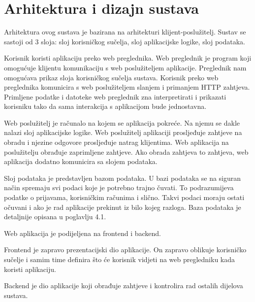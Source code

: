 \chapter{Arhitektura i dizajn sustava}
		
		Arhitektura ovog sustava je bazirana na arhitekturi klijent-poslužitelj. Sustav se sastoji od 3 sloja: sloj korisničkog sučelja, sloj aplikacijske logike, sloj podataka.
		
		Korisnik koristi aplikaciju preko web preglednika. Web preglednik je program koji omogućuje klijentu komunikaciju s web poslužiteljem aplikacije. Preglednik nam omogućava prikaz sloja korisničkog sučelja sustava. Korisnik preko web preglednika komunicira s web poslužiteljem slanjem i primanjem HTTP zahtjeva. Primljene podatke i datoteke web preglednik zna interpretirati i prikazati korisniku tako da sama interakcija s aplikacijom bude jednostavna.
		
		Web poslužitelj je računalo na kojem se aplikacija pokreće. Na njemu se dakle nalazi sloj aplikacijske logike. Web poslužitelj aplikaciji prosljeđuje zahtjeve na obradu i njezine odgovore prosljeđuje natrag klijentima. Web aplikacija na poslužitelju obrađuje zaprimljene zahtjeve. Ako obrada zahtjeva to zahtjeva, web aplikacija dodatno komunicira sa slojem podataka.
		
		Sloj podataka je predstavljen bazom podataka. U bazi podataka se na siguran način spremaju svi podaci koje je potrebno trajno čuvati. To podrazumijeva podatke o prijavama, korisničkim računima i slično. Takvi podaci moraju ostati očuvani i ako je rad aplikacije prekinut iz bilo kojeg razloga. Baza podataka je detaljnije opisana u poglavlju  4.1.
		
		Web aplikacija je podijeljena na frontend i backend.
		
		Frontend je zapravo prezentacijski dio aplikacije. On zapravo oblikuje korisničko sučelje i samim time definira što će korisnik vidjeti na web pregledniku kada koristi aplikaciju.
		
		Backend je dio aplikacije koji obrađuje zahtjeve i kontrolira rad ostalih dijelova sustava.
		
